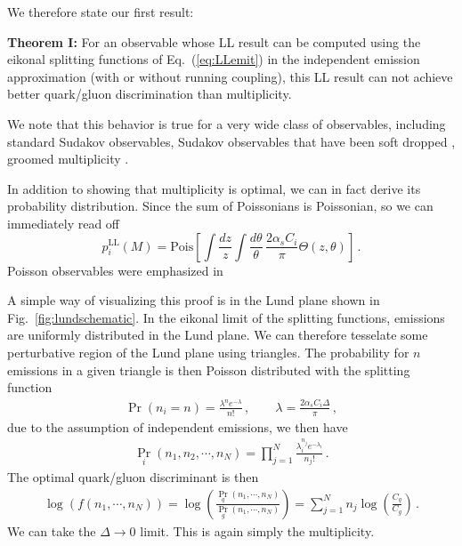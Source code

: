 \documentclass[letterpaper,11pt]{article}
\DeclareRobustCommand{\Fig}[1]{Fig.~\ref{#1}}
\DeclareRobustCommand{\Eq}[1]{Eq.~(\ref{#1})}
\begin{document}
We therefore state our first result:

\vspace{1cm}
{\bf Theorem I:} For an observable whose LL result can be computed using the eikonal splitting functions of \Eq{eq:LLemit} in the independent emission approximation (with or without running coupling), this LL result can not achieve better quark/gluon discrimination than multiplicity.
\vspace{1cm}


We note that this behavior is true for a very wide class of observables, including standard Sudakov observables, Sudakov observables that have been soft dropped \cite{Larkoski:2014wba}, groomed multiplicity \cite{Frye:2017yrw}.

In addition to showing that multiplicity is optimal, we can in fact derive its probability distribution. Since the sum of Poissonians is Poissonian, so we can immediately read off
\begin{equation}
p^\text{LL}_i(M) = \text{Pois}\left[\int \frac{dz}{z} \int \frac{d\theta}{\theta}\, \frac{2\alpha_s C_i}{\pi} \Theta(z,\theta)\right]\,.
\end{equation}
Poisson observables were emphasized in
\cite{Frye:2017yrw}

A simple way of visualizing this proof is in the Lund plane shown in \Fig{fig:lundschematic}. In the eikonal limit of the splitting functions, emissions are uniformly distributed in the Lund plane. We can therefore tesselate some perturbative region of the Lund plane using triangles. The probability for $n$ emissions in a given triangle is then Poisson distributed with the splitting function
\begin{align}
\Pr(n_i=n)=\frac{\lambda^n e^{-\lambda}}{n!}\,, \qquad \lambda=\frac{2\alpha_s C_i \Delta}{\pi}\,,
\end{align}
due to the assumption of independent emissions, we then have
\begin{align}
{\Pr}_i(n_1, n_2, \cdots, n_N)=\prod\limits_{j=1}^N \frac{\lambda_i^{n_j} e^{-\lambda_i}}{n_j!}\,.
\end{align}
The optimal quark/gluon discriminant is then
\begin{align}
\log \left(  f(n_1, \cdots, n_N) \right)  =   \log \left( \frac{{\Pr}_q(n_1, \cdots, n_N)}{{\Pr}_g(n_1, \cdots, n_N)} \right) =\sum\limits_{j=1}^N n_j \log\left(\frac{C_q}{C_g}  \right)\,.
\end{align}
We can take the $\Delta\to 0$ limit. This is again simply the multiplicity. 
\end{document}
